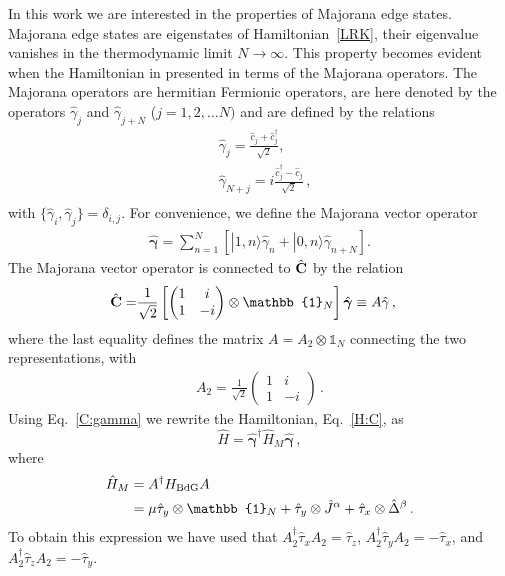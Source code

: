 \documentclass[pra,twocolumn,
superscriptaddress,
showpacs,
aps
]{revtex4-1}
\begin{document}
In this work we are interested in the properties of Majorana edge states. Majorana edge states are eigenstates of Hamiltonian~\eqref{LRK}, their eigenvalue vanishes in the thermodynamic limit $N\to\infty$. This property becomes evident when the Hamiltonian in presented in terms of the Majorana operators. The Majorana operators are hermitian Fermionic operators, are here denoted by the operators $\hat{\gamma}_j$ and $\hat{\gamma}_{j+N}$ ($j=1,2,\dots N)$ and are defined by the relations
\begin{align*}
&\hat{\gamma}_j=\frac{\hat{c}_j+\hat{c}_{j}^\dagger}{\sqrt{2}},\\
&\hat{\gamma}_{N+j}=i\frac{\hat{c}_j^\dagger-\hat{c}_{j}}{\sqrt{2}}\,,\\
\end{align*}
with $\{\hat{\gamma}_i,\hat{\gamma}_j\}=\delta_{i,j}$. For convenience, we define the Majorana vector operator
\begin{align}
\label{def:gamma}
\hat{\boldsymbol{\gamma}}=\sum_{n=1}^N\left[|1,n\rangle\hat{\gamma}_n+|0,n\rangle\hat{\gamma}_{n+N}\right].
\end{align}
The Majorana vector operator is connected to $\hat{\bf C}$ by the relation 
\begin{align}
\label{C:gamma}
\hat{\bf C}=&\frac{1}{\sqrt{2}}\left[\begin{pmatrix}
1 &i\\
1& -i
\end{pmatrix}\otimes\mathbb{1}_N\right]\hat{\boldsymbol{\gamma}}\equiv A\hat\gamma\,,
\end{align}
where the last equality defines the matrix $A=A_2\otimes \mathbb{1}_N$ connecting the two representations, with
\begin{align}
A_2=\frac{1}{\sqrt{2}}\begin{pmatrix}
1 &i\\
1& -i
\end{pmatrix}\,.
\end{align}
Using Eq.~\eqref{C:gamma} we rewrite the Hamiltonian, Eq.~\eqref{H:C}, as
\begin{equation}
\hat{H}=\hat{\boldsymbol{\gamma}}^{\dag}\hat{H}_{M}\hat{\boldsymbol{\gamma}}\,,
\end{equation}
where
\begin{align}
\hat{H}_{M}&=A^\dagger H_{\rm BdG}A\nonumber\\
&=\mu\hat{\tau}_y\otimes\mathbb{1}_N+\hat{\tau}_y\otimes \hat{J}^{\alpha}+\hat{\tau}_x\otimes \hat{\Delta}^{\beta}\,.\label{H:M}
\end{align}
To obtain this expression we have used that $A_2^\dagger\hat{\tau}_xA_2=\hat\tau_z$, $A_2^\dagger\hat{\tau}_yA_2=-\hat\tau_x$, and $A_2^\dagger\hat{\tau}_zA_2=-\hat\tau_y$.
\end{document}

